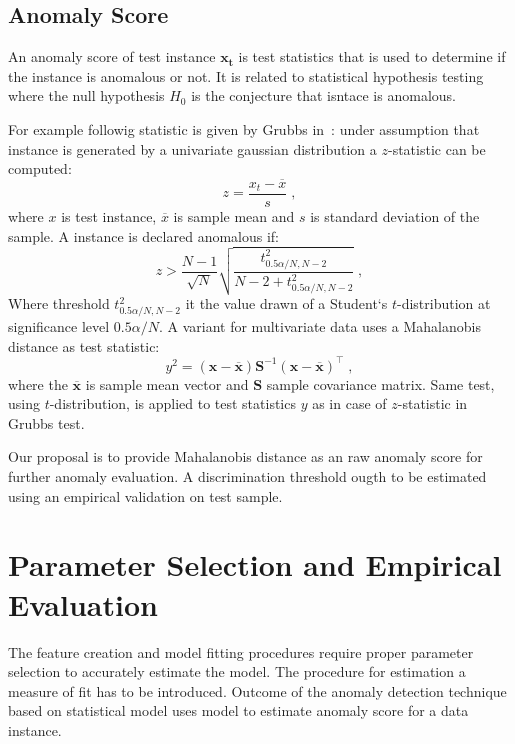 
\subsection{Anomaly Score}

An anomaly score of test instance $\mathbf{x_t}$ is test statistics that is used 
to determine if the instance is anomalous or not. It is related to statistical hypothesis testing where
the null hypothesis $H_0$ is the conjecture that isntace is anomalous.

For example followig statistic is given by  Grubbs in~\cite{grubbs1969procedures}:
under assumption that instance is generated by a univariate gaussian distribution 
a $z$-statistic can be computed:
\begin{equation}
	{z} = \frac{{x_t}-\overline{{x}}}{{s}}\;, 
\end{equation}
where $x$ is test instance, $\overline{{x}}$ is sample mean and ${s}$ is standard deviation 
of the sample. A instance is declared anomalous if:
\begin{equation}
	{z} > \frac{N-1}{\sqrt{N}}\sqrt{\frac{t^2_{0.5\alpha/N,N-2}}{N-2+t^2_{0.5\alpha/N,N-2}}}\;,
\end{equation}
Where threshold $t^2_{0.5\alpha/N,N-2}$ it the value drawn of a Student`s $t$-distribution at significance level 
$0.5\alpha/N$. 
A variant for multivariate data uses a Mahalanobis distance as test statistic:
\begin{equation}
	y^2 = (\mathbf{x} - \overline{\mathbf{x}})\mathbf{S}^{-1}(\mathbf{x} - \overline{\mathbf{x}})^\top\;,
\end{equation}
where the $\overline{\mathbf{x}}$ is sample mean vector and $\mathbf{S}$ sample covariance matrix.
Same test, using $t$-distribution, is applied to test statistics $y$ as in case of $z$-statistic in Grubbs test.

Our proposal is to provide Mahalanobis distance as an raw anomaly score for further anomaly evaluation.
A discrimination threshold ougth to be estimated using an empirical validation on test sample.
 
\section{Parameter Selection and Empirical Evaluation}\label{sec:val}

The feature creation and model fitting procedures require proper parameter selection to accurately
estimate the model. The procedure for estimation a measure of fit has to be introduced.
Outcome of the anomaly detection technique based on statistical model uses model
to estimate anomaly score for a data instance.

